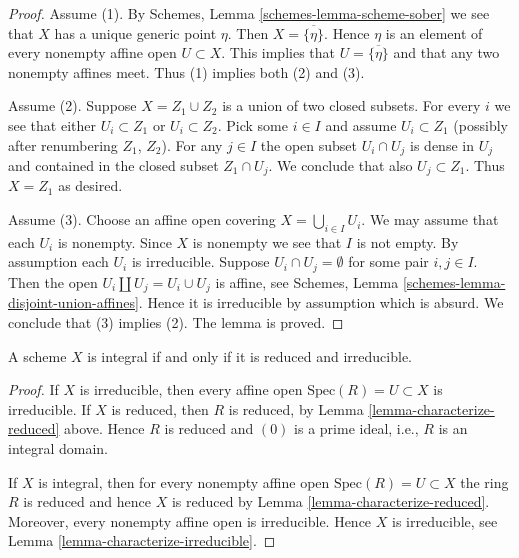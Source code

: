 \begin{proof}
Assume (1). By Schemes, Lemma \ref{schemes-lemma-scheme-sober}
we see that $X$ has a unique generic point $\eta$. Then
$X = \overline{\{\eta\}}$. Hence $\eta$ is an element of
every nonempty affine open $U \subset X$. This implies
that $U = \overline{\{\eta\}}$ and that any two nonempty affines
meet. Thus (1) implies both (2) and (3).

\medskip\noindent
Assume (2). Suppose $X = Z_1 \cup Z_2$ is a union of two closed subsets.
For every $i$ we see that either $U_i \subset Z_1$ or $U_i \subset Z_2$.
Pick some $i \in I$ and assume $U_i \subset Z_1$ (possibly after renumbering
$Z_1$, $Z_2$). For any $j \in I$ the open subset $U_i \cap U_j$ is dense in
$U_j$ and contained in the closed subset $Z_1 \cap U_j$. We conclude that
also $U_j \subset Z_1$. Thus $X = Z_1$ as desired.

\medskip\noindent
Assume (3). Choose an affine open covering $X = \bigcup_{i \in I} U_i$.
We may assume that each $U_i$ is nonempty.
Since $X$ is nonempty we see that $I$ is not empty.
By assumption each $U_i$ is irreducible.
Suppose $U_i \cap U_j = \emptyset$ for some pair $i, j \in I$.
Then the open $U_i \coprod  U_j = U_i \cup U_j$ is affine, see
Schemes, Lemma \ref{schemes-lemma-disjoint-union-affines}.
Hence it is irreducible by assumption which is absurd. We conclude that (3)
implies (2). The lemma is proved.
\end{proof}

\begin{lemma}
\label{lemma-characterize-integral}
A scheme $X$ is integral if and only if it is reduced and irreducible.
\end{lemma}

\begin{proof}
If $X$ is irreducible, then every affine open $\text{Spec}(R) = U \subset X$
is irreducible. If $X$ is reduced, then $R$ is reduced, by
Lemma \ref{lemma-characterize-reduced} above. Hence $R$ is reduced
and $(0)$ is a prime ideal, i.e., $R$ is an integral domain.

\medskip\noindent
If $X$ is integral, then for every nonempty affine open
$\text{Spec}(R) = U \subset X$ the ring $R$ is reduced
and hence $X$ is reduced by Lemma \ref{lemma-characterize-reduced}.
Moreover, every nonempty affine open is irreducible.
Hence $X$ is irreducible, see Lemma \ref{lemma-characterize-irreducible}.
\end{proof}


